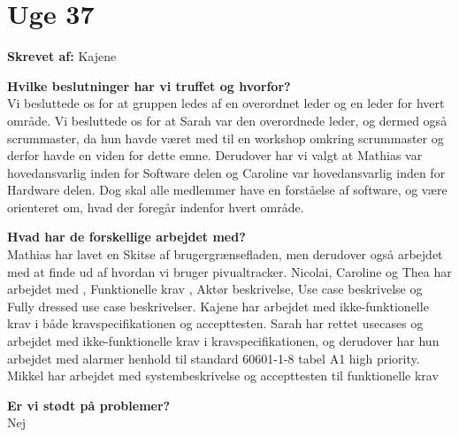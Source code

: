 \section{Uge 37}
\textbf{Skrevet af:}  
Kajene

\textbf{Hvilke beslutninger har vi truffet og hvorfor?} \\
Vi besluttede os for at gruppen ledes af en overordnet leder og en leder for hvert område.
Vi besluttede os for at Sarah var den overordnede leder, og dermed også scrummaster, da hun havde været med til en workshop omkring scrummaster og derfor havde en viden for dette emne. Derudover har vi valgt at Mathias var hovedansvarlig inden for Software delen og Caroline var hovedansvarlig inden for Hardware delen. Dog skal alle medlemmer have en forståelse af software, og være orienteret om, hvad der foregår indenfor hvert område. 


\textbf{Hvad har de forskellige arbejdet med?} \\
Mathias har lavet en Skitse af brugergrænsefladen, men derudover også arbejdet med at finde ud af hvordan vi bruger pivualtracker. Nicolai, Caroline  og Thea har arbejdet med , Funktionelle krav , Aktør beskrivelse, Use case beskrivelse og Fully dressed use case beskrivelser. Kajene har arbejdet med ikke-funktionelle krav i både kravspecifikationen og accepttesten. Sarah har rettet usecases og arbejdet med ikke-funktionelle krav i kravspecifikationen, og derudover har hun arbejdet med alarmer henhold til standard 60601-1-8 tabel A1 high priority. Mikkel har arbejdet med systembeskrivelse og accepttesten til funktionelle krav



\textbf{Er vi stødt på problemer? } \\
Nej

\clearpage